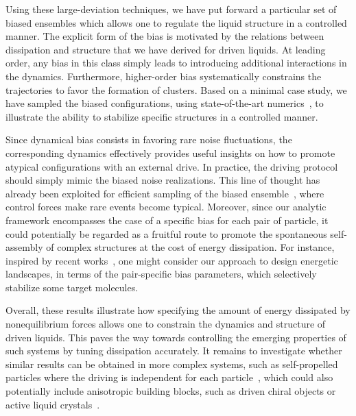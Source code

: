 \documentclass[superscriptaddress, twocolumn, prx, longbibliography, nofootinbib]{revtex4-1}
\begin{document}
Using these large-deviation techniques, we have put forward a particular set of biased ensembles which allows one to regulate the liquid structure in a controlled manner. The explicit form of the bias is motivated by the relations between dissipation and structure that we have derived for driven liquids. At leading order, any bias in this class simply leads to introducing additional interactions in the dynamics. Furthermore, higher-order bias systematically constrains the trajectories to favor the formation of clusters. Based on a minimal case study, we have sampled the biased configurations, using state-of-the-art numerics~\cite{Giadina2006, tailleur2007probing, Hurtado2009, Nemoto2016, Ray2018, Klymko2018, Brewer2018}, to illustrate the ability to stabilize specific structures in a controlled manner. 


Since dynamical bias consists in favoring rare noise fluctuations, the corresponding dynamics effectively provides useful insights on how to promote atypical configurations with an external drive. In practice, the driving protocol should simply mimic the biased noise realizations. This line of thought has already been exploited for efficient sampling of the biased ensemble~\cite{Nemoto2016, Jack2017, Jack2018}, where control forces make rare events become typical. Moreover, since our analytic framework encompasses the case of a specific bias for each pair of particle, it could potentially be regarded as a fruitful route to promote the spontaneous self-assembly of complex structures at the cost of energy dissipation. For instance, inspired by recent works~\cite{Murugan2015, Murugan2017b}, one might consider our approach to design energetic landscapes, in terms of the pair-specific bias parameters, which selectively stabilize some target molecules. 


Overall, these results illustrate how specifying the amount of energy dissipated by nonequilibrium forces allows one to constrain the dynamics and structure of driven liquids. This paves the way towards controlling the emerging properties of such systems by tuning dissipation accurately. It remains to investigate whether similar results can be obtained in more complex systems, such as self-propelled particles where the driving is independent for each particle~\cite{Marchetti2013, Cates2015, Bechinger2016, Marchetti2018}, which could also potentially include anisotropic building blocks, such as driven chiral objects or active liquid crystals~\cite{Joshi2017, VanZuiden2016, Nguyen2014b}. 


\end{document}
